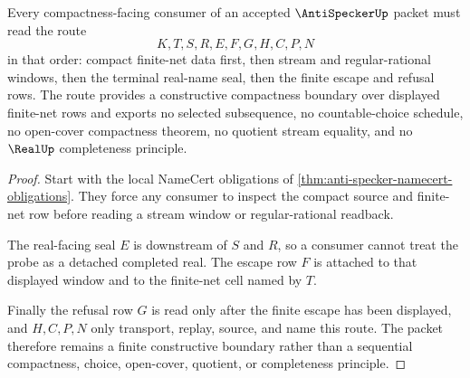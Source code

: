 \begin{theorem}
\label{thm:anti-specker-finite-escape-route}
Every compactness-facing consumer of an accepted $\AntiSpeckerUp$ packet must read the route
$$
K,T,S,R,E,F,G,H,C,P,N
$$
in that order: compact finite-net data first, then stream and regular-rational windows, then the terminal real-name seal, then the finite escape and refusal rows. The route provides a constructive compactness boundary over displayed finite-net rows and exports no selected subsequence, no countable-choice schedule, no open-cover compactness theorem, no quotient stream equality, and no $\RealUp$ completeness principle.
\end{theorem}
\begin{proof}
Start with the local NameCert obligations of \autoref{thm:anti-specker-namecert-obligations}. They force any consumer to inspect the compact source and finite-net row before reading a stream window or regular-rational readback.

The real-facing seal $E$ is downstream of $S$ and $R$, so a consumer cannot treat the probe as a detached completed real. The escape row $F$ is attached to that displayed window and to the finite-net cell named by $T$.

Finally the refusal row $G$ is read only after the finite escape has been displayed, and $H,C,P,N$ only transport, replay, source, and name this route. The packet therefore remains a finite constructive boundary rather than a sequential compactness, choice, open-cover, quotient, or completeness principle.
\end{proof}


\begin{closurestatus}{\AntiSpeckerUp}
  \theoryclosure{\seedClosure}
  \formalstatus{\unformalizedV}
\end{closurestatus}
